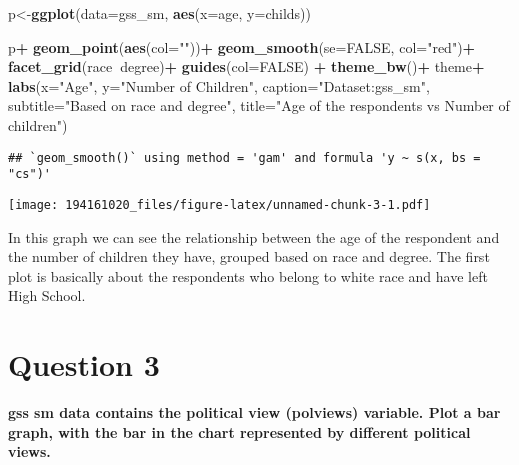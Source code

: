 \documentclass[
]{article}
\newenvironment{Shaded}{\begin{snugshade}}{\end{snugshade}}
\newcommand{\DataTypeTok}[1]{\textcolor[rgb]{0.13,0.29,0.53}{#1}}
\newcommand{\KeywordTok}[1]{\textcolor[rgb]{0.13,0.29,0.53}{\textbf{#1}}}
\newcommand{\NormalTok}[1]{#1}
\newcommand{\OperatorTok}[1]{\textcolor[rgb]{0.81,0.36,0.00}{\textbf{#1}}}
\newcommand{\OtherTok}[1]{\textcolor[rgb]{0.56,0.35,0.01}{#1}}
\newcommand{\StringTok}[1]{\textcolor[rgb]{0.31,0.60,0.02}{#1}}
\begin{document}
\begin{Shaded}
\begin{Highlighting}[]
\NormalTok{p<-}\KeywordTok{ggplot}\NormalTok{(}\DataTypeTok{data=}\NormalTok{gss_sm, }\KeywordTok{aes}\NormalTok{(}\DataTypeTok{x=}\NormalTok{age, }\DataTypeTok{y=}\NormalTok{childs))}

\NormalTok{p}\OperatorTok{+}\StringTok{ }\KeywordTok{geom_point}\NormalTok{(}\KeywordTok{aes}\NormalTok{(}\DataTypeTok{col=}\StringTok{""}\NormalTok{))}\OperatorTok{+}
\StringTok{  }\KeywordTok{geom_smooth}\NormalTok{(}\DataTypeTok{se=}\OtherTok{FALSE}\NormalTok{, }\DataTypeTok{col=}\StringTok{"red"}\NormalTok{)}\OperatorTok{+}
\StringTok{  }\KeywordTok{facet_grid}\NormalTok{(race}\OperatorTok{~}\NormalTok{degree)}\OperatorTok{+}
\StringTok{   }\KeywordTok{guides}\NormalTok{(}\DataTypeTok{col=}\OtherTok{FALSE}\NormalTok{) }\OperatorTok{+}\StringTok{ }
\StringTok{  }\KeywordTok{theme_bw}\NormalTok{()}\OperatorTok{+}
\StringTok{  }\NormalTok{theme}\OperatorTok{+}
\StringTok{  }\KeywordTok{labs}\NormalTok{(}\DataTypeTok{x=}\StringTok{"Age"}\NormalTok{, }\DataTypeTok{y=}\StringTok{"Number of Children"}\NormalTok{, }
       \DataTypeTok{caption=}\StringTok{"Dataset:gss_sm"}\NormalTok{,}
       \DataTypeTok{subtitle=}\StringTok{"Based on race and degree"}\NormalTok{,}
       \DataTypeTok{title=}\StringTok{"Age of the respondents vs Number of children"}\NormalTok{)}
\end{Highlighting}
\end{Shaded}

\begin{verbatim}
## `geom_smooth()` using method = 'gam' and formula 'y ~ s(x, bs = "cs")'
\end{verbatim}

\texttt{[image: 194161020\_files/figure-latex/unnamed-chunk-3-1.pdf]}

In this graph we can see the relationship between the age of the
respondent and the number of children they have, grouped based on race
and degree. The first plot is basically about the respondents who belong
to white race and have left High School.

\hypertarget{question-3}{%
\section{Question 3}\label{question-3}}

\textbf{gss sm data contains the political view (polviews) variable.
Plot a bar graph, with the bar in the chart represented by different
political views.}
\end{document}
